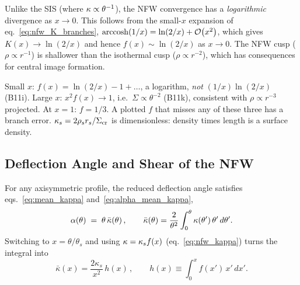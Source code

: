\begin{remark}
Unlike the SIS (where $\kappa \propto \theta^{-1}$), the NFW
convergence has a \textit{logarithmic} divergence as $x \to 0$.  This
follows from the small-$x$ expansion of eq.~\eqref{eq:nfw_K_branches},
$\operatorname{arccosh}(1/x) = \ln(2/x) + \mathcal{O}\!\left(x^2\right)$, which gives
$K(x)\to \ln(2/x)$ and hence $f(x) \sim \ln(2/x)$ as $x\to 0$.  The
NFW cusp ($\rho \propto r^{-1}$) is shallower than the isothermal cusp
($\rho \propto r^{-2}$), which has consequences for central image
formation.
\end{remark}

\begin{annotation}
Small $x$: $f(x) = \ln(2/x)-1+\ldots$, a logarithm, \emph{not}
$(1/x)\ln(2/x)$ (B11i).  Large $x$: $x^2f(x)\to1$, i.e.\ $\Sigma\propto\theta^{-2}$
(B11k), consistent with $\rho\propto r^{-3}$ projected.  At $x=1$: $f = 1/3$.  A
plotted $f$ that misses any of these three has a branch error.
$\kappa_s = 2\rho_sr_s/\Sigma_{\mathrm{cr}}$ is dimensionless: density times length is a
surface density.
\end{annotation}

\subsection{Deflection Angle and Shear of the NFW}

For any axisymmetric profile, the reduced deflection angle satisfies
eqs.~\eqref{eq:mean_kappa} and~\eqref{eq:alpha_mean_kappa},
\begin{equation}
    \alpha(\theta) \;=\; \theta\,\bar\kappa(\theta) \,,
    \qquad
    \bar\kappa(\theta) = \frac{2}{\theta^2}\int_0^\theta
        \kappa(\theta')\,\theta'\,d\theta'.
    \label{eq:nfw_alpha_setup}
\end{equation}
Switching to $x = \theta/\theta_s$ and using
$\kappa = \kappa_s f(x)$ (eq.~\ref{eq:nfw_kappa}) turns the integral
into
\begin{equation}
    \bar\kappa(x) = \frac{2\kappa_s}{x^2}\,h(x) \,,
    \qquad
    h(x) \equiv \int_0^x f(x')\,x'\,dx'.
    \label{eq:nfw_hdef}
\end{equation}

